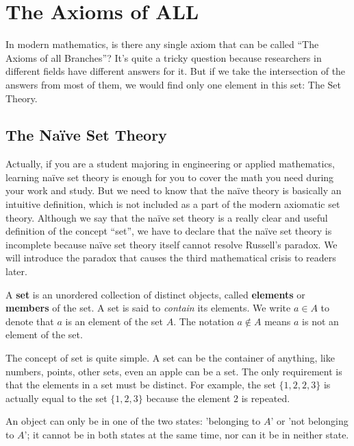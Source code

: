 \chapter{The Axioms of ALL}
\renewcommand{\thesection}{\arabic{chapter}.\arabic{section}} %

In modern mathematics, is there any single axiom that can be called “The Axioms of all Branches”? It’s quite a tricky question because researchers in different fields have different answers for it. But if we take the intersection of the answers from most of them, we would find only one element in this set: The Set Theory.

\section{The Naïve Set Theory}
Actually, if you are a student majoring in engineering or applied mathematics, learning naïve set theory is enough for you to cover the math you need during your work and study. But we need to know that the naïve theory is basically an intuitive definition, which is not included as a part of the modern axiomatic set theory. Although we say that the naïve set theory is a really clear and useful definition of the concept “set”, we have to declare that the naïve set theory is incomplete because naïve set theory itself cannot resolve Russell's paradox. We will introduce the paradox that causes the third mathematical crisis to readers later.

\begin{definition}[Set]
A \textbf{set} is an unordered collection of distinct objects, called \textbf{elements} or \textbf{members} of the set. A set is said to \emph{contain} its elements. We write $a \in A$ to denote that $a$ is an element of the set $A$. The notation $a \notin A$ means $a$ is not an element of the set.
\end{definition}

The concept of set is quite simple. A set can be the container of anything, like numbers, points, other sets, even an apple can be a set. The only requirement is that the elements in a set must be distinct. For example, the set $\{1, 2, 2, 3\}$ is actually equal to the set $\{1, 2, 3\}$ because the element $2$ is repeated.

\begin{note}
An object can only be in one of the two states: 'belonging to $A$' or 'not belonging to $A$'; it cannot be in both states at the same time, nor can it be in neither state.
\end{note}


